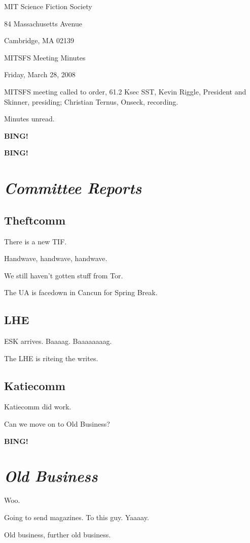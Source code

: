 \documentclass[10pt]{article}
\newcommand{\bing}{{\bf BING!} }
\newcommand{\goto}[1]{\bing \vskip 12pt \section*{{\em{#1}}}}
\begin{document}
\begin{center}

MIT Science Fiction Society

84 Massachusetts Avenue

Cambridge, MA 02139

\vspace{12pt}

MITSFS Meeting Minutes

Friday, March 28, 2008

\end{center}

\vspace{18pt}

\setlength{\parskip}{6pt}

\noindent
MITSFS meeting called to order, 61.2 Ksec SST,
Kevin Riggle, President and Skinner, presiding; Christian Ternus, Onseck, recording.

Minutes unread.

\bing 

\goto{Committee Reports}

\subsection*{Theftcomm}

There is a new TIF.

Handwave, handwave, handwave.

We still haven't gotten stuff from Tor.

The UA is facedown in Cancun for Spring Break.

\subsection*{LHE}

ESK arrives.  Baaaag.  Baaaaaaaag.

The LHE is riteing the writes.

\subsection*{Katiecomm}

Katiecomm did work.

Can we move on to Old Business?

\goto{Old Business}

Woo.

Going to send magazines.  To this guy.  Yaaaay.

Old business, further old business.
\end{document}
